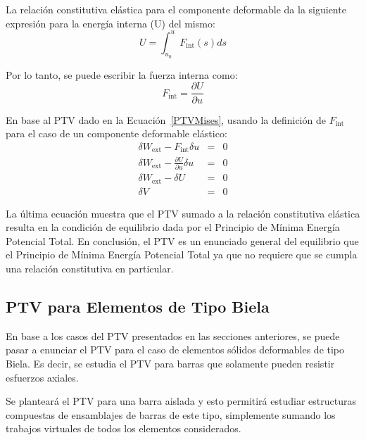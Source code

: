 La relación constitutiva elástica para el componente deformable da la siguiente expresión para la energía interna (U) del mismo:
%
\begin{equation}
U =  \int_{u_0}^{u} F_{\text{int}}(s)ds
\end{equation}

Por lo tanto, se puede escribir la fuerza interna como:
%
\begin{equation}
F_{\text{int}} = \frac{\partial U}{\partial u}
\end{equation}

En base al PTV dado en la Ecuación~\eqref{PTVMises}, usando la definición de $F_{\text{int}}$ para el caso de un componente deformable elástico:
%
\begin{eqnarray}
\delta W_{\text{ext}} - F_{\text{int}}\delta u &=& 0\nonumber\\ 
\delta W_{\text{ext}} - \frac{\partial U}{\partial u} \delta u &=& 0\nonumber\\
\delta W_{\text{ext}} - \delta U &=& 0 \nonumber\\
\delta V &=& 0\nonumber
\end{eqnarray}

La última ecuación muestra que el PTV sumado a la relación constitutiva elástica resulta en la condición de equilibrio dada por el Principio de Mínima Energía Potencial Total. En conclusión, el PTV es un enunciado general del equilibrio que el Principio de Mínima Energía Potencial Total ya que no requiere que se cumpla una relación constitutiva en particular.


\subsection{PTV para Elementos de Tipo Biela}\label{Sec:PTVBielas}

En base a los casos del PTV presentados en las secciones anteriores, se puede pasar a enunciar el PTV para el caso de elementos sólidos deformables de tipo Biela. Es decir, se estudia el PTV para barras que solamente pueden resistir esfuerzos axiales.

Se planteará el PTV para una barra aislada y esto permitirá estudiar estructuras compuestas de ensamblajes de barras de este tipo, simplemente sumando los trabajos virtuales de todos los elementos considerados.

